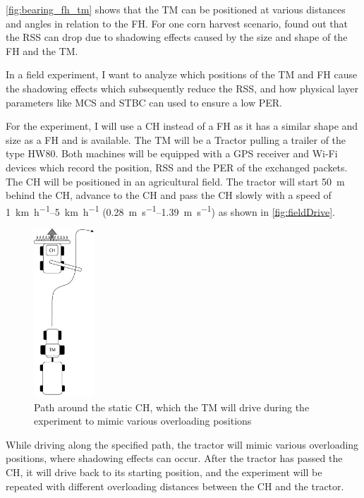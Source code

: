 \autoref{fig:bearing_fh_tm} shows that the \ac{TM} can be positioned at various distances and angles in relation to the \ac{FH}.
For one corn harvest scenario, \textcite{klingler_agriculture_2018} found out that the \ac{RSS} can drop due to
shadowing effects caused by the size and shape of the \ac{FH} and the \ac{TM}.

In a field experiment, I want to analyze which positions of the \ac{TM} and \ac{FH} cause the shadowing effects which
subsequently reduce the \ac{RSS}, and how physical layer parameters like \ac{MCS} and \ac{STBC} can used to ensure a low
\ac{PER}.

For the experiment, I will use a \ac{CH} instead of a \ac{FH} as it has a similar shape and size as a \ac{FH} and is available.
The \ac{TM} will be a Tractor pulling a trailer of the type HW80.
Both machines will be equipped with a \ac{GPS} receiver and Wi-Fi devices which record the position, \ac{RSS} and the \ac{PER} of the
exchanged packets.
The \ac{CH} will be positioned in an agricultural field.
The tractor will start \SI{50}{\metre} behind the \ac{CH}, advance to the \ac{CH} and pass the \ac{CH} slowly with a
speed of \SIrange{1}{5}{\kilo\metre\per\hour} (\SIrange{0.28}{1.39}{\metre\per\second}) as shown in \autoref{fig:fieldDrive}.
\begin{figure}[]%
	\centering
	\includegraphics[width=0.2\textwidth]{figures/FieldExperimentDrive}
	\caption{Path around the static \acf{CH}, which the \acf{TM} will drive during the experiment to mimic various overloading positions}%
	\label{fig:fieldDrive}
\end{figure}
While driving along the specified path, the tractor will mimic various overloading positions, where shadowing effects can occur. After the tractor has passed the \ac{CH},
it will drive back to its starting position, and the experiment will be repeated with different overloading distances between the \ac{CH} and the tractor.

